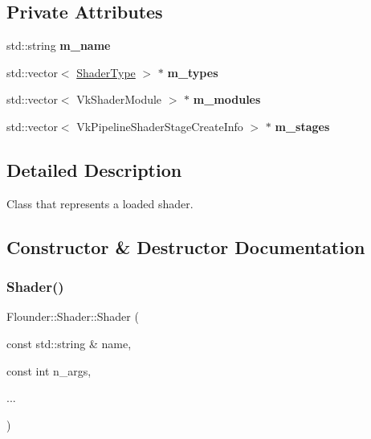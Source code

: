 \subsection*{Private Attributes}
\begin{DoxyCompactItemize}
\item 
\mbox{\label{class_flounder_1_1_shader_a38eadf558068f0fa363dbbc188b9c28e}} 
std\+::string {\bfseries m\+\_\+name}
\item 
\mbox{\label{class_flounder_1_1_shader_a7f39b62e23fd6eb46b29f02a4c2ebce6}} 
std\+::vector$<$ \hyperlink{class_flounder_1_1_shader_type}{Shader\+Type} $>$ $\ast$ {\bfseries m\+\_\+types}
\item 
\mbox{\label{class_flounder_1_1_shader_a09df2d701e128518c7ead7c5cbeea865}} 
std\+::vector$<$ Vk\+Shader\+Module $>$ $\ast$ {\bfseries m\+\_\+modules}
\item 
\mbox{\label{class_flounder_1_1_shader_acd17c7a0b3520522148d2c9898275157}} 
std\+::vector$<$ Vk\+Pipeline\+Shader\+Stage\+Create\+Info $>$ $\ast$ {\bfseries m\+\_\+stages}
\end{DoxyCompactItemize}


\subsection{Detailed Description}
Class that represents a loaded shader. 



\subsection{Constructor \& Destructor Documentation}
\mbox{\label{class_flounder_1_1_shader_aeb83ee00de5f098c02633985484ca004}} 
\subsubsection{\texorpdfstring{Shader()}{Shader()}}
{\footnotesize\ttfamily Flounder\+::\+Shader\+::\+Shader (\begin{DoxyParamCaption}\item[{const std\+::string \&}]{name,  }\item[{const int}]{n\+\_\+args,  }\item[{}]{... }\end{DoxyParamCaption})}



